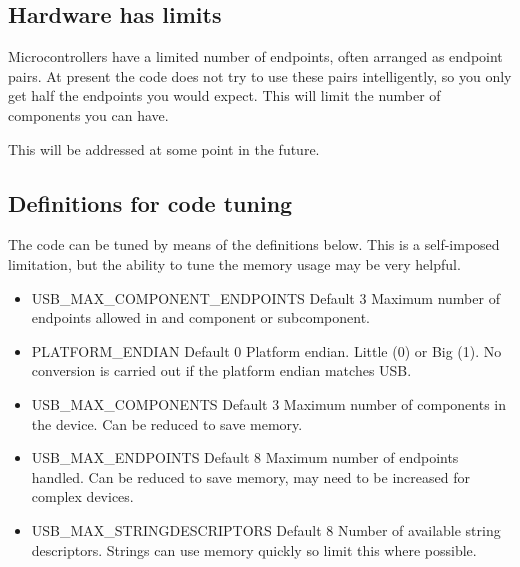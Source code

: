 \subsection{Hardware has limits}
Microcontrollers have a limited number of endpoints, often arranged as endpoint pairs. At present the code does not try to use these pairs intelligently, so you only get half the endpoints you would expect. This will limit the number of components you can have.

This will be addressed at some point in the future.

\subsection{Definitions for code tuning}
The code can be tuned by means of the definitions below. This is a self-imposed limitation, but the ability to tune the memory usage may be very helpful.

\begin{itemize}
  \item USB\_MAX\_COMPONENT\_ENDPOINTS
    \subitem Default 3
    \subitem Maximum number of endpoints allowed in and component or subcomponent.

  \item PLATFORM\_ENDIAN
    \subitem Default 0
    \subitem Platform endian. Little (0) or Big (1). No conversion is carried out if the platform endian matches USB.

  \item USB\_MAX\_COMPONENTS
    \subitem Default 3
    \subitem Maximum number of components in the device. Can be reduced to save memory.

  \item USB\_MAX\_ENDPOINTS
    \subitem Default 8
    \subitem Maximum number of endpoints handled. Can be reduced to save memory, may need to be increased for complex devices.

  \item USB\_MAX\_STRINGDESCRIPTORS
    \subitem Default 8
    \subitem Number of available string descriptors. Strings can use memory quickly so limit this where possible.
\end{itemize}

